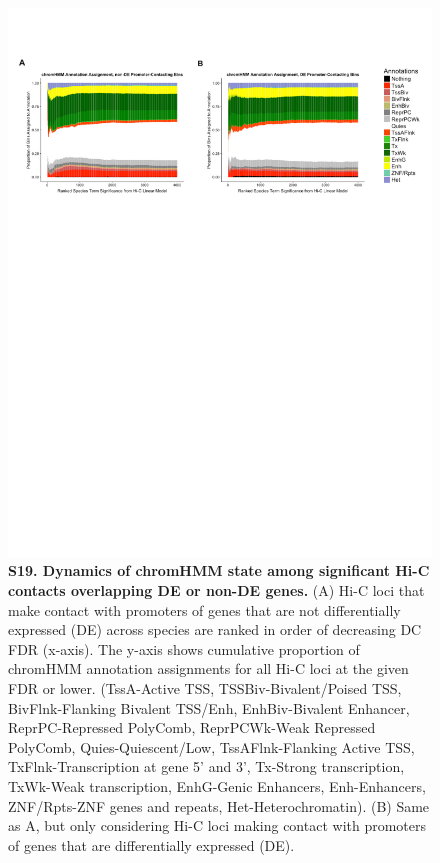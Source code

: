 \begin{figure}[!htb]
\centering
\includegraphics[width=6in]{img/figS19.pdf}
\caption[Dynamics of chromHMM state among significant Hi-C contacts overlapping DE or non-DE genes.]{\textbf{S19. Dynamics of chromHMM state among significant Hi-C contacts overlapping DE or non-DE genes.} (A) Hi-C loci that make contact with promoters of genes that are not differentially expressed (DE) across species are ranked in order of decreasing DC FDR (x-axis). The y-axis shows cumulative proportion of chromHMM annotation assignments for all Hi-C loci at the given FDR or lower. (TssA-Active TSS, TSSBiv-Bivalent/Poised TSS, BivFlnk-Flanking Bivalent TSS/Enh, EnhBiv-Bivalent Enhancer, ReprPC-Repressed PolyComb, ReprPCWk-Weak Repressed PolyComb, Quies-Quiescent/Low, TssAFlnk-Flanking Active TSS, TxFlnk-Transcription at gene 5' and 3', Tx-Strong transcription, TxWk-Weak transcription, EnhG-Genic Enhancers, Enh-Enhancers, ZNF/Rpts-ZNF genes and repeats, Het-Heterochromatin). (B) Same as A, but only considering Hi-C loci making contact with promoters of genes that are differentially expressed (DE).}
\label{fig:figS19}
\end{figure}

